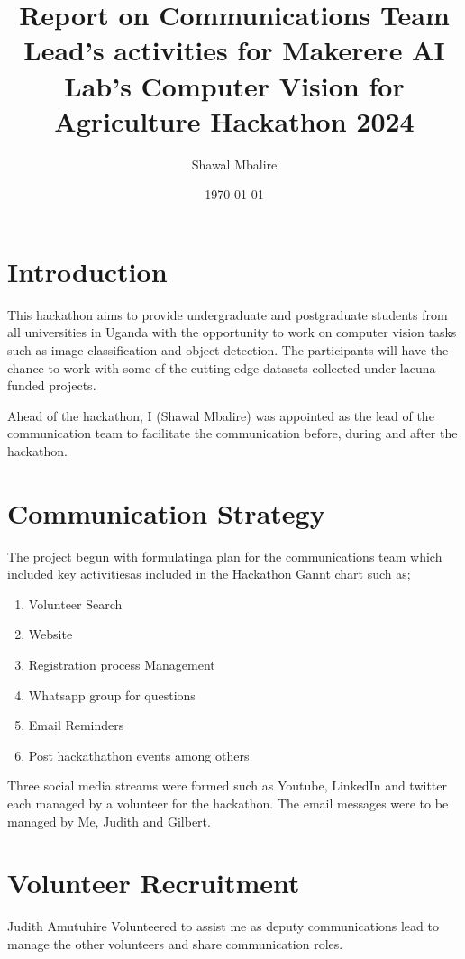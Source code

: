 \documentclass[a4paper,12pt]{report}
\title{Report on Communications Team Lead's activities for Makerere AI Lab's Computer Vision for Agriculture Hackathon 2024}
\author{Shawal Mbalire}
\date{\today}
\begin{document}
    \maketitle

    \section{Introduction}    
    
    This hackathon aims to provide undergraduate and postgraduate students from all universities in Uganda with the opportunity to work on computer vision tasks such as image classification and object detection. The participants will have the chance to work with some of the cutting-edge datasets collected under lacuna-funded projects. 
    
    Ahead of the hackathon, I (Shawal Mbalire) was appointed as the lead of the communication team to facilitate the communication before, during and after the hackathon.\\

    \section{Communication Strategy}
    The project begun with formulatinga plan for the communications team which included key activitiesas included in the Hackathon Gannt chart such as;
    \begin{enumerate}
        \item Volunteer Search
        \item Website
        \item Registration process Management
        \item Whatsapp group for questions
        \item Email Reminders
        \item Post hackathathon events among others
    \end{enumerate}
    Three social media streams were formed such as Youtube, LinkedIn and twitter each managed by a volunteer for the hackathon.
    The email messages were to be managed by Me, Judith and Gilbert.

    \section{Volunteer Recruitment}
    Judith Amutuhire Volunteered to assist me as deputy communications lead to manage the other volunteers and share communication roles.
\end{document}
